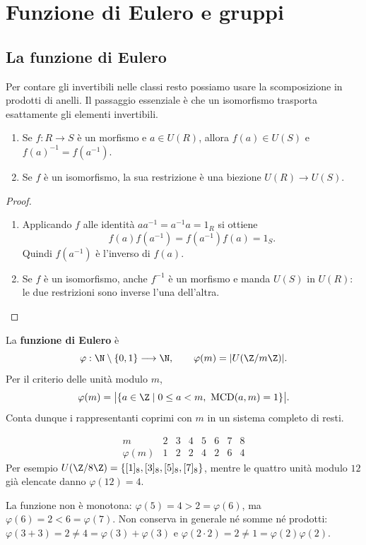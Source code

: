 \chapter{Funzione di Eulero e gruppi}\label{cap:eulero-gruppi}

\section{La funzione di Eulero}
Per contare gli invertibili nelle classi resto possiamo usare la scomposizione in prodotti di anelli. Il passaggio essenziale è che un isomorfismo trasporta esattamente gli elementi invertibili.

\begin{proposizione}\label{prop:trasporto-unita}
\begin{enumerate}[label=\arabic*.]
\item Se $f:R\to S$ è un morfismo e $a\in U(R)$, allora $f(a)\in U(S)$ e $f(a)^{-1}=f(a^{-1})$.
\item Se $f$ è un isomorfismo, la sua restrizione è una biezione $U(R)\to U(S)$.
\end{enumerate}
\end{proposizione}
\begin{proof}
\begin{enumerate}[label=\arabic*.]
\item Applicando $f$ alle identità $aa^{-1}=a^{-1}a=1_R$ si ottiene
\[
f(a)f(a^{-1})=f(a^{-1})f(a)=1_S.
\]
Quindi $f(a^{-1})$ è l'inverso di $f(a)$.
\item Se $f$ è un isomorfismo, anche $f^{-1}$ è un morfismo e manda $U(S)$ in $U(R)$: le due restrizioni sono inverse l'una dell'altra.
\end{enumerate}
\end{proof}

\begin{definizione}
La \textbf{funzione di Eulero} è
\[
\varphi:\N\setminus\{0,1\}\longrightarrow\N,\qquad
\varphi(m)=|U(\Z/m\Z)|.
\]
Per il criterio delle unità modulo $m$,
\[
\varphi(m)=\bigl|\{a\in\Z\mid 0\le a<m,\ \operatorname{MCD}(a,m)=1\}\bigr|.
\]
Conta dunque i rappresentanti coprimi con $m$ in un sistema completo di resti.
\end{definizione}

\begin{esempio}
\[
\begin{array}{c|rrrrrrr}
m&2&3&4&5&6&7&8\\\hline
\varphi(m)&1&2&2&4&2&6&4
\end{array}
\]
Per esempio $U(\Z/8\Z)=\{[1]_8,[3]_8,[5]_8,[7]_8\}$, mentre le quattro unità modulo $12$ già elencate danno $\varphi(12)=4$.

La funzione non è monotona: $\varphi(5)=4>2=\varphi(6)$, ma $\varphi(6)=2<6=\varphi(7)$. Non conserva in generale né somme né prodotti: $\varphi(3+3)=2\ne4=\varphi(3)+\varphi(3)$ e $\varphi(2\cdot2)=2\ne1=\varphi(2)\varphi(2)$.
\end{esempio}

